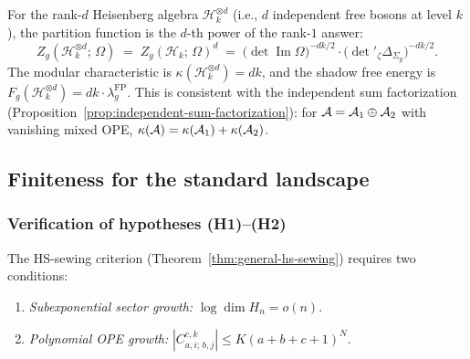 \begin{remark}
\label{rem:thqg-I-rank-d-heisenberg}
For the rank-$d$ Heisenberg algebra $\mathcal{H}_k^{\otimes d}$ (i.e., $d$ independent free bosons at level $k$), the partition function is the $d$-th power of the rank-$1$ answer:
\begin{equation}\label{eq:thqg-I-rank-d}
Z_g(\mathcal{H}_k^{\otimes d};\,\Omega) \;=\; Z_g(\mathcal{H}_k;\,\Omega)^d \;=\; \bigl(\det\operatorname{Im}\Omega\bigr)^{-dk/2} \cdot \bigl(\det{}'_\zeta\Delta_{\Sigma_g}\bigr)^{-dk/2}.
\end{equation}
The modular characteristic is $\kappa(\mathcal{H}_k^{\otimes d}) = dk$, and the shadow free energy is $F_g(\mathcal{H}_k^{\otimes d}) = dk \cdot \lambda_g^{\mathrm{FP}}$. This is consistent with the independent sum factorization (Proposition~\ref{prop:independent-sum-factorization}): for $\mathcal{A} = \mathcal{A}_1 \oplus \mathcal{A}_2$ with vanishing mixed OPE, $\kappa(\mathcal{A}) = \kappa(\mathcal{A}_1) + \kappa(\mathcal{A}_2)$.
\end{remark}



\subsection{Finiteness for the standard landscape}
\label{subsec:thqg-I-standard-landscape}

\subsubsection{Verification of hypotheses (H1)--(H2)}

The HS-sewing criterion (Theorem~\ref{thm:general-hs-sewing}) requires two conditions:
\begin{enumerate}[label=\textbf{(H\arabic*)}]
\item \label{item:thqg-I-H1} \emph{Subexponential sector growth:} $\log \dim H_n = o(n)$.
\item \label{item:thqg-I-H2} \emph{Polynomial OPE growth:} $|C^{c,k}_{a,i;\,b,j}| \leq K(a+b+c+1)^N$.
\end{enumerate}


